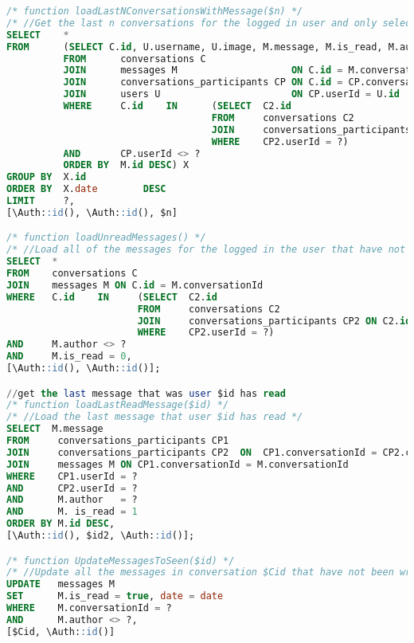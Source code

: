 \begin{lstlisting}[language=sql]
/* function loadLastNConversationsWithMessage($n) */
/* //Get the last n conversations for the logged in user and only select the latest message for each of them */
SELECT    *
FROM      (SELECT C.id, U.username, U.image, M.message, M.is_read, M.author, M.date
          FROM      conversations C
          JOIN      messages M                    ON C.id = M.conversationId
          JOIN      conversations_participants CP ON C.id = CP.conversationId
          JOIN      users U                       ON CP.userId = U.id
          WHERE     C.id    IN      (SELECT  C2.id
                                    FROM     conversations C2
                                    JOIN     conversations_participants CP2 ON C2.id = CP2.conversationId
                                    WHERE    CP2.userId = ?)
          AND       CP.userId <> ?
          ORDER BY  M.id DESC) X
GROUP BY  X.id
ORDER BY  X.date        DESC
LIMIT     ?,
[\Auth::id(), \Auth::id(), $n]

/* function loadUnreadMessages() */
/* //Load all of the messages for the logged in the user that have not been read yet */
SELECT  *
FROM    conversations C
JOIN    messages M ON C.id = M.conversationId
WHERE   C.id    IN     (SELECT  C2.id
                       FROM     conversations C2
                       JOIN     conversations_participants CP2 ON C2.id = CP2.conversationId
                       WHERE    CP2.userId = ?)
AND     M.author <> ?
AND     M.is_read = 0,
[\Auth::id(), \Auth::id()];

//get the last message that was user $id has read
/* function loadLastReadMessage($id) */
/* //Load the last message that user $id has read */
SELECT  M.message
FROM     conversations_participants CP1
JOIN     conversations_participants CP2  ON  CP1.conversationId = CP2.conversationId
JOIN     messages M ON CP1.conversationId = M.conversationId
WHERE    CP1.userId = ?
AND      CP2.userId = ?
AND      M.author   = ?
AND      M. is_read = 1
ORDER BY M.id DESC,
[\Auth::id(), $id2, \Auth::id()];

/* function UpdateMessagesToSeen($id) */
/* //Update all the messages in conversation $Cid that have not been written by the logged in user to seenm */
UPDATE   messages M
SET      M.is_read = true, date = date
WHERE    M.conversationId = ?
AND      M.author <> ?,
[$Cid, \Auth::id()]

\end{lstlisting}
